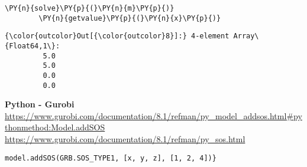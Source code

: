 \begin{codeCell}
\begin{Verbatim}[commandchars=\\\{\}]
        \PY{n}{solve}\PY{p}{(}\PY{n}{m}\PY{p}{)}
        \PY{n}{getvalue}\PY{p}{(}\PY{n}{x}\PY{p}{)}
\end{Verbatim}


\begin{Verbatim}[commandchars=\\\{\}]
{\color{outcolor}Out[{\color{outcolor}8}]:} 4-element Array\{Float64,1\}:
         5.0
         5.0
         0.0
         0.0
\end{Verbatim}


\textbf{Python - Gurobi}\\
\url{https://www.gurobi.com/documentation/8.1/refman/py_model_addsos.html#pythonmethod:Model.addSOS}\\
\url{https://www.gurobi.com/documentation/8.1/refman/py_sos.html}


\begin{verbatim}
model.addSOS(GRB.SOS_TYPE1, [x, y, z], [1, 2, 4])}
\end{verbatim}


\end{codeCell}

